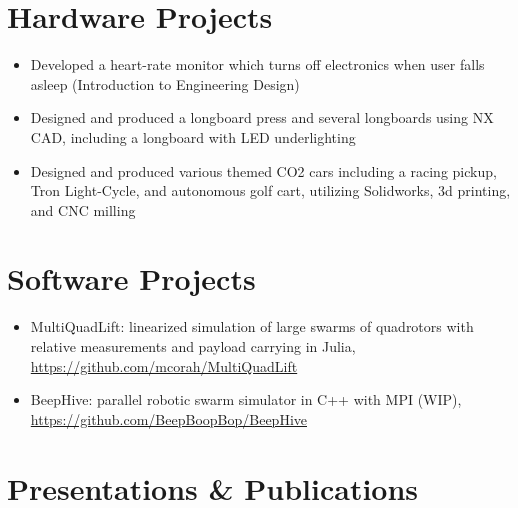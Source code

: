 \documentclass[margin]{res}
\begin{document}
\begin{resume}
\normalsize{\section{Hardware Projects}}
\begin{itemize}
  \item Developed a heart-rate monitor which turns off electronics when user
    falls asleep (Introduction to Engineering Design)
  \item Designed and produced a longboard press and several longboards using NX CAD, including a longboard
        with LED underlighting
  \item Designed and produced various themed CO2 cars including a racing pickup, Tron Light-Cycle,
        and autonomous golf cart, utilizing Solidworks, 3d printing, and CNC milling
\end{itemize}
\normalsize{\section{Software Projects}}
\begin{itemize}
  \item MultiQuadLift: linearized simulation of large swarms of quadrotors with
    relative measurements and payload carrying in Julia,
    \url{https://github.com/mcorah/MultiQuadLift}
  \item BeepHive: parallel robotic swarm simulator in C++ with MPI (WIP),\\
    \url{https://github.com/BeepBoopBop/BeepHive}
\end{itemize}
\normalsize{\section{Presentations \& Publications}}
\nocite{persistentpaper}
\nocite{persistentposter}
\nocite{boeingposter}
\nocite{boeingpaper}

{
  \let\oldbibitem\bibitem
  \renewcommand{\bibitem}[1]{\itemindent5mm\oldbibitem {#1}}
  \renewcommand{\section}[2]{}
  
}
\end{resume}
\end{document}
